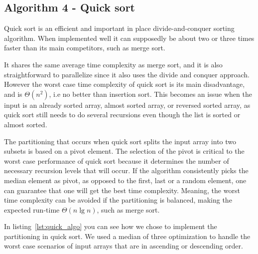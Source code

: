 \documentclass[sigconf, nonacm, natbib, screen, balance=False]{acmart}
\begin{document}
\subsection{Algorithm 4 - Quick sort}\label{sec:algo4}

Quick sort is an efficient and important in place divide-and-conquer sorting algorithm. When implemented well it can supposedly be about two or three times faster than its main competitors, such as merge sort.

It shares the same average time complexity as merge sort, and it is also straightforward to parallelize since it also uses the divide and conquer approach. However the worst case time complexity of quick sort is its main disadvantage, and is $\Theta(n^2)$, i.e no better than insertion sort. This becomes an issue when the input is  an already sorted array, almost sorted array, or reversed sorted array, as quick sort still needs to do several recursions even though the list is sorted or almost sorted. 

The partitioning that occurs when quick sort splits the input array into two subsets is based on a pivot element. The selection of the pivot is critical to the worst case performance of quick sort because it determines the number of necessary recursion levels that will occur. If the algorithm consistently picks the median element as pivot, as opposed to the first, last or a random element, one can guarantee that one will get the best time complexity. Meaning, the worst time complexity can be avoided if the partitioning is balanced, making the expected run-time $\Theta(n\lg n)$, such as merge sort.

In listing~\ref{lst:quick_algo} you can see how we chose to implement the partitioning in quick sort. We used a median of three optimization to handle the worst case scenarios of input arrays that are in ascending or descending order. 
\end{document}
